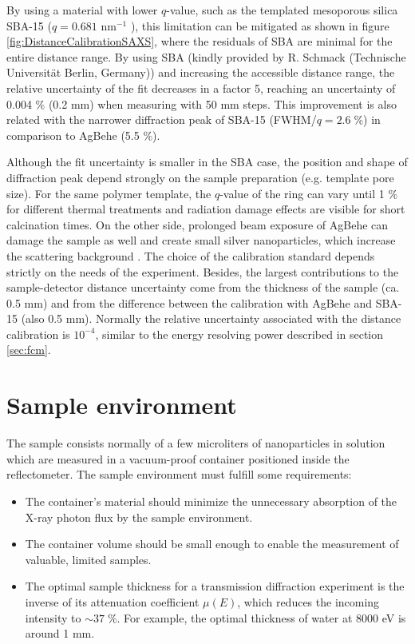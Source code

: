 By using a material with lower $q$-value, such as the templated mesoporous silica SBA-15 ($q=0.681$ nm$^{-1}$ \citep{zhao_triblock_1998}), this limitation can be mitigated as shown in figure \ref{fig:DistanceCalibrationSAXS}, where the residuals of SBA are minimal for the entire distance range. By using SBA (kindly provided by R. Schmack (Technische Universität Berlin, Germany)) and increasing the accessible distance range, the relative uncertainty of the fit decreases in a factor 5, reaching an uncertainty of 0.004 $\%$ (0.2 mm) when measuring with 50 mm steps. This improvement is also related with the narrower diffraction peak of SBA-15 (FWHM/$q=2.6\;\%$) in comparison to AgBehe (5.5 $\%$).

Although the fit uncertainty is smaller in the SBA case, the position and shape of diffraction peak depend strongly on the sample preparation (e.g. template pore size). For the same polymer template, the $q$-value of the ring can vary until 1 $\%$ for different thermal treatments and radiation damage effects are visible for short calcination times. On the other side, prolonged beam exposure of AgBehe can damage the sample as well and create small silver nanoparticles, which increase the scattering background \citep{liu_thermal_2006}. The choice of the calibration standard depends strictly on the needs of the experiment. Besides, the largest contributions to the sample-detector distance uncertainty come from the thickness of the sample (ca. 0.5 mm) and from the difference between the calibration with AgBehe and SBA-15 (also 0.5 mm). Normally the relative uncertainty associated with the distance calibration is $10^{-4}$, similar to the energy resolving power described in section \ref{sec:fcm}.

\section{Sample environment}
\label{sec:sample_environment}

The sample consists normally of a few microliters of nanoparticles in solution which are measured in a vacuum-proof container positioned inside the reflectometer. The sample environment must fulfill some requirements:

\begin{itemize}
        \item The container's material should minimize the unnecessary absorption of the X-ray photon flux by the sample environment.
        \item The container volume should be small enough to enable the measurement of valuable, limited samples.
        \item The optimal sample thickness for a transmission diffraction experiment is the inverse of its attenuation coefficient $\mu(E)$, which reduces the incoming intensity to $\sim37\;\%$. For example, the optimal thickness of water at 8000 eV is around 1 mm.
\end{itemize}

